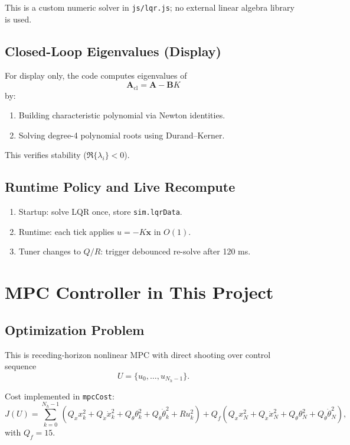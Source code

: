 \documentclass[11pt,a4paper]{article}
\newcommand{\state}{\mathbf{x}}
\newcommand{\A}{\mathbf{A}}
\newcommand{\B}{\mathbf{B}}
\begin{document}
This is a custom numeric solver in \texttt{js/lqr.js}; no external linear algebra library is used.

\subsection{Closed-Loop Eigenvalues (Display)}
For display only, the code computes eigenvalues of
\begin{equation}
\A_{\text{cl}} = \A - \B K
\end{equation}
by:
\begin{enumerate}[label=\arabic*.]
  \item Building characteristic polynomial via Newton identities.
  \item Solving degree-4 polynomial roots using Durand--Kerner.
\end{enumerate}

This verifies stability ($\Re\{\lambda_i\}<0$).

\subsection{Runtime Policy and Live Recompute}
\begin{enumerate}[label=\arabic*.]
  \item Startup: solve LQR once, store \texttt{sim.lqrData}.
  \item Runtime: each tick applies $u=-K\state$ in $O(1)$.
  \item Tuner changes to $Q/R$: trigger debounced re-solve after 120 ms.
\end{enumerate}

\section{MPC Controller in This Project}
\subsection{Optimization Problem}
This is receding-horizon nonlinear MPC with direct shooting over control sequence
\begin{equation}
U=\{u_0,\ldots,u_{N_h-1}\}.
\end{equation}

Cost implemented in \texttt{mpcCost}:
\begin{equation}
J(U)=\sum_{k=0}^{N_h-1}\left(
Q_x x_k^2 + Q_{\dot{x}}\dot{x}_k^2 + Q_\theta \theta_k^2 + Q_{\dot{\theta}}\dot{\theta}_k^2 + R u_k^2
\right)
 + Q_f\!\left(Q_x x_N^2 + Q_{\dot{x}}\dot{x}_N^2 + Q_\theta \theta_N^2 + Q_{\dot{\theta}}\dot{\theta}_N^2\right),
\end{equation}
with $Q_f=15$.
\end{document}
